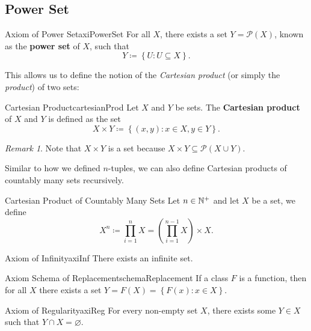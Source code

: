 \documentclass[math]{amznotes}
\theoremstyle{remark}
\newtheorem*{remark}{Remark}
\begin{document}
\subsection{Power Set}
\begin{axibox}{Axiom of Power Set}{axiPowerSet}
    For all $X$, there exists a set $Y = \mathcal{P}(X)$, known as the {\color{red} \textbf{power set}} of $X$, such that
    \begin{equation*}
        Y \coloneqq \left\{U \colon U \subseteq X\right\}.
    \end{equation*}
\end{axibox}
This allows us to define the notion of the \textit{Cartesian product} (or simply the \textit{product}) of two sets:
\begin{dfnbox}{Cartesian Product}{cartesianProd}
    Let $X$ and $Y$ be sets. The {\color{red} \textbf{Cartesian product}} of $X$ and $Y$ is defined as the set
    \begin{displaymath}
        X \times Y \coloneqq \left\{(x, y) \colon x \in X, y \in Y\right\}.
    \end{displaymath}
\end{dfnbox}
\begin{notebox}
    \begin{remark}
        Note that $X \times Y$ is a set because $X \times Y \subseteq \mathcal{P}(X \cup Y)$.
    \end{remark}
\end{notebox}
Similar to how we defined $n$-tuples, we can also define Cartesian products of countably many sets recursively.
\begin{dfnbox}{Cartesian Product of Countably Many Sets}
    Let $n \in \mathbb{N}^+$ and let $X$ be a set, we define
    \begin{displaymath}
        X^n \coloneqq \prod_{i = 1}^n X = \left(\prod_{i = 1}^{n - 1} X\right) \times X.
    \end{displaymath}
\end{dfnbox}
\begin{axibox}{Axiom of Infinity}{axiInf}
    There exists an infinite set.
\end{axibox}
\begin{axibox}{Axiom Schema of Replacement}{schemaReplacement}
    If a class $F$ is a function, then for all $X$ there exists a set $Y = F(X) = \left\{F(x) \colon x \in X\right\}$.
\end{axibox}
\begin{axibox}{Axiom of Regularity}{axiReg}
    For every non-empty set $X$, there exists some $Y \in X$ such that $Y \cap X = \varnothing$.
\end{axibox}
\end{document}
